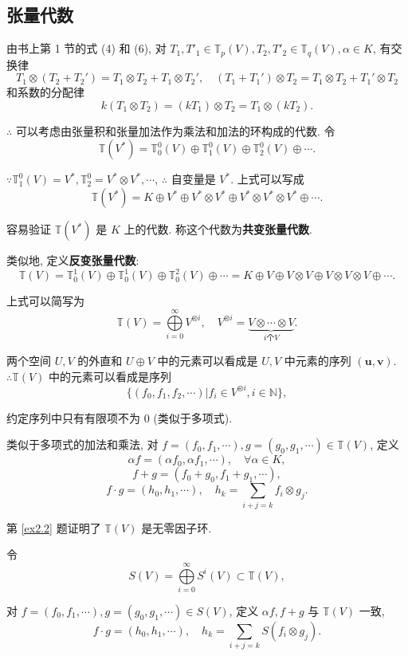\documentclass{ctexart}
\begin{document}
\subsection{张量代数}
由书上第 1 节的式 (4) 和 (6), 对 $T_1,T'_1\in\mathbb{T}_p(V),T_2,T'_2\in\mathbb{T}_q(V),\alpha\in K$, 有交换律
\[T_1\otimes(T_2+T_2')=T_1\otimes T_2+T_1\otimes T_2',\quad (T_1+T_1')\otimes T_2=T_1\otimes T_2+T_1'\otimes T_2\]
和系数的分配律
\[k(T_1\otimes T_2)=(kT_1)\otimes T_2=T_1\otimes(kT_2).\]

$\therefore$ 可以考虑由张量积和张量加法作为乘法和加法的环构成的代数. 令
\[\mathbb{T}(V^*)=\mathbb{T}_0^0(V)\oplus\mathbb{T}_1^0(V)\oplus\mathbb{T}_2^0(V)\oplus\cdots.\]

$\because\mathbb{T}_1^0(V)=V^*,\mathbb{T}_2^0=V^*\otimes V^*,\cdots$, $\therefore$ 自变量是 $V^*$. 上式可以写成
\[\mathbb{T}(V^*)=K\oplus V^*\oplus V^*\otimes V^*\oplus V^*\otimes V^*\otimes V^*\oplus\cdots.\]

容易验证 $\mathbb{T}(V^*)$ 是 $K$ 上的代数. 称这个代数为\textbf{共变张量代数}.

类似地, 定义\textbf{反变张量代数}:
\[\mathbb{T}(V)=\mathbb{T}_0^1(V)\oplus\mathbb{T}_0^1(V)\oplus\mathbb{T}_0^2(V)\oplus\cdots=K\oplus V\oplus V\otimes V\oplus V\otimes V\otimes V\oplus\cdots.\]

上式可以简写为
\[\mathbb{T}(V)=\bigoplus\limits_{i=0}^\infty V^{\otimes i},\quad V^{\otimes i}=\underbrace{V\otimes\cdots\otimes V}_{i\text{个}V}.\]

两个空间 $U,V$ 的外直和 $U\oplus V$ 中的元素可以看成是 $U,V$ 中元素的序列 $(\boldsymbol{u},\boldsymbol{v})$. $\therefore\mathbb{T}(V)$ 中的元素可以看成是序列
\[\{(f_0,f_1,f_2,\cdots)|f_i\in V^{\otimes i},i\in\mathbb{N}\},\]

约定序列中只有有限项不为 $0$ (类似于多项式).

类似于多项式的加法和乘法, 对 $f=(f_0,f_1,\cdots),g=(g_0,g_1,\cdots)\in\mathbb{T}(V)$, 定义
\[\alpha f=(\alpha f_0,\alpha f_1,\cdots),\quad\forall\alpha\in K,\]
\[f+g=(f_0+g_0,f_1+g_1,\cdots),\]
\[f\cdot g=(h_0,h_1,\cdots),\quad h_k=\sum\limits_{i+j=k}f_i\otimes g_j.\]

第 \ref{ex2.2} 题证明了 $\mathbb{T}(V)$ 是无零因子环.

令
\[S(V)=\bigoplus\limits_{i=0}^\infty S^i(V)\subset\mathbb{T}(V),\]

对 $f=(f_0,f_1,\cdots),g=(g_0,g_1,\cdots)\in S(V)$, 定义 $\alpha f,f+g$ 与 $\mathbb{T}(V)$ 一致,
\[f\cdot g=(h_0,h_1,\cdots),\quad h_k=\sum\limits_{i+j=k}S(f_i\otimes g_j).\]
\end{document}

